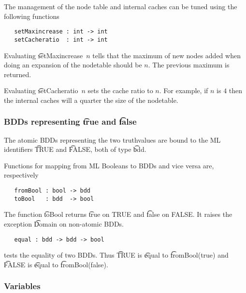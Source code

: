 \medskip

The management of the node table and internal caches can be tuned
using the following functions


\begin{verbatim}
   setMaxincrease : int -> int
   setCacheratio  : int -> int
\end{verbatim}

Evaluating \t{setMaxincrease~$n$} tells \Buddy{} that the maximum of new nodes added
when doing an expansion of the nodetable should be $n$.  The previous maximum is returned.

Evaluating \t{setCacheratio~$n$} sets the cache ratio to $n$.  
For example, if $n$ is $4$ then the internal caches will a quarter the size of the
nodetable.

\subsubsection{BDDs representing {\t{true}} and {\t{false}}}

The atomic BDDs representing the two truthvalues are bound to the ML
identifiers \t{TRUE} and \t{FALSE}, both of type \t{bdd}.

Functions for mapping from ML Booleans to BDDs and vice versa are, respectively

\begin{verbatim}
   fromBool : bool -> bdd
   toBool   : bdd  -> bool
\end{verbatim}

The function \t{toBool} returns \t{true} on TRUE and \t{false} on FALSE.
It raises the exception \t{Domain} on non-atomic BDDs.

\begin{verbatim}
   equal : bdd -> bdd -> bool
\end{verbatim}

tests the equality of two BDDs. Thus \t{TRUE} is \t{equal} to \t{fromBool(true)} and 
\t{FALSE} is \t{equal} to \t{fromBool(false)}.

\subsubsection{Variables}

